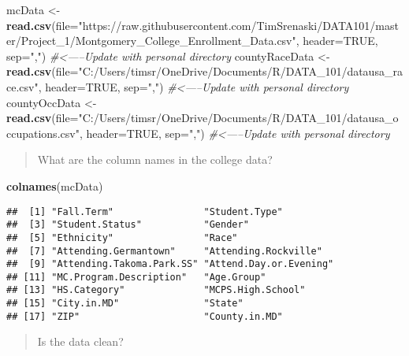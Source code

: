 \documentclass[]{article}
\newenvironment{Shaded}{\begin{snugshade}}{\end{snugshade}}
\newcommand{\KeywordTok}[1]{\textcolor[rgb]{0.13,0.29,0.53}{\textbf{#1}}}
\newcommand{\DataTypeTok}[1]{\textcolor[rgb]{0.13,0.29,0.53}{#1}}
\newcommand{\StringTok}[1]{\textcolor[rgb]{0.31,0.60,0.02}{#1}}
\newcommand{\CommentTok}[1]{\textcolor[rgb]{0.56,0.35,0.01}{\textit{#1}}}
\newcommand{\OtherTok}[1]{\textcolor[rgb]{0.56,0.35,0.01}{#1}}
\newcommand{\NormalTok}[1]{#1}
\begin{document}
\begin{Shaded}
\begin{Highlighting}[]
\NormalTok{mcData <-}\StringTok{ }\KeywordTok{read.csv}\NormalTok{(}\DataTypeTok{file=}\StringTok{"https://raw.githubusercontent.com/TimSrenaski/DATA101/master/Project_1/Montgomery_College_Enrollment_Data.csv"}\NormalTok{, }\DataTypeTok{header=}\OtherTok{TRUE}\NormalTok{, }\DataTypeTok{sep=}\StringTok{","}\NormalTok{) }\CommentTok{#<-----Update with personal directory}
\NormalTok{countyRaceData <-}\StringTok{ }\KeywordTok{read.csv}\NormalTok{(}\DataTypeTok{file=}\StringTok{"C:/Users/timsr/OneDrive/Documents/R/DATA_101/datausa_race.csv"}\NormalTok{, }\DataTypeTok{header=}\OtherTok{TRUE}\NormalTok{, }\DataTypeTok{sep=}\StringTok{","}\NormalTok{) }\CommentTok{#<-----Update with personal directory}
\NormalTok{countyOccData <-}\StringTok{ }\KeywordTok{read.csv}\NormalTok{(}\DataTypeTok{file=}\StringTok{"C:/Users/timsr/OneDrive/Documents/R/DATA_101/datausa_occupations.csv"}\NormalTok{, }\DataTypeTok{header=}\OtherTok{TRUE}\NormalTok{, }\DataTypeTok{sep=}\StringTok{","}\NormalTok{) }\CommentTok{#<-----Update with personal directory}
\end{Highlighting}
\end{Shaded}

\begin{quote}
What are the column names in the college data?
\end{quote}

\begin{Shaded}
\begin{Highlighting}[]
\KeywordTok{colnames}\NormalTok{(mcData)}
\end{Highlighting}
\end{Shaded}

\begin{verbatim}
##  [1] "Fall.Term"                "Student.Type"            
##  [3] "Student.Status"           "Gender"                  
##  [5] "Ethnicity"                "Race"                    
##  [7] "Attending.Germantown"     "Attending.Rockville"     
##  [9] "Attending.Takoma.Park.SS" "Attend.Day.or.Evening"   
## [11] "MC.Program.Description"   "Age.Group"               
## [13] "HS.Category"              "MCPS.High.School"        
## [15] "City.in.MD"               "State"                   
## [17] "ZIP"                      "County.in.MD"
\end{verbatim}

\begin{quote}
Is the data clean?
\end{quote}
\end{document}
